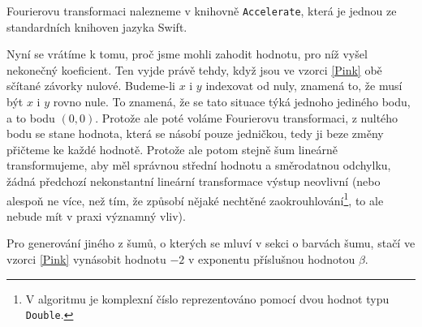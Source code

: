 Fourierovu transformaci nalezneme v knihovně {\tt Accelerate}, která je jednou ze
standardních knihoven jazyka Swift.

Nyní se vrátíme k tomu, proč jsme mohli zahodit hodnotu, pro níž vyšel
nekonečný koeficient. Ten vyjde právě tehdy, když jsou ve vzorci \eqref{Pink}
obě sčítané závorky nulové. Budeme-li $x$ i $y$ indexovat od nuly, znamená to,
že musí být $x$ i $y$ rovno nule. To znamená, že se tato situace týká jednoho
jediného bodu, a to bodu $(0,0)$. Protože ale poté voláme Fourierovu
transformaci, z nultého bodu se stane hodnota, která se násobí pouze jedničkou,
tedy ji beze změny přičteme ke každé hodnotě. Protože ale potom stejně šum
lineárně transformujeme, aby měl správnou střední hodnotu a směrodatnou
odchylku, žádná předchozí nekonstantní lineární transformace výstup neovlivní
(nebo alespoň ne více, než tím, že způsobí nějaké nechtěné
zaokrouhlování\footnote{V algoritmu je komplexní číslo reprezentováno pomocí
dvou hodnot typu {\tt Double}.}, to ale nebude mít v praxi významný vliv).

Pro generování jiného z šumů, o kterých se mluví v sekci o barvách šumu, stačí 
ve vzorci \eqref{Pink} vynásobit hodnotu $-2$ v exponentu příslušnou hodnotou $\beta$.
